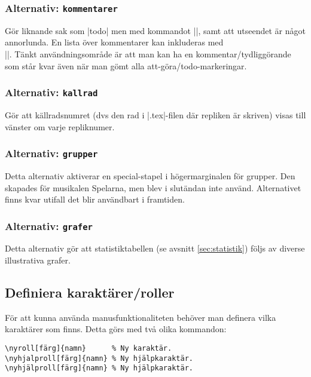 \documentclass[a4paper,12pt]{article}
\begin{document}
\subsubsection{Alternativ: \texttt{kommentarer}}
\label{alt:kommentarer}
Gör liknande sak som |todo| men med kommandot |\kommentar|, samt att utseendet är något annorlunda. En lista över kommentarer kan inkluderas med \\|\kommentarlista|. Tänkt användningsområde är att man kan ha en kommentar/tydliggörande som står kvar även när man gömt alla att-göra/todo-markeringar.

\subsubsection{Alternativ: \texttt{kallrad}}
\label{alt:kallrad}
Gör att källradsnumret (dvs den rad i |.tex|-filen där repliken är skriven) visas till vänster om varje repliknumer.


\subsubsection{Alternativ: \texttt{grupper}}
\label{alt:grupper}
Detta alternativ aktiverar en special-stapel i högermarginalen för grupper. Den skapades för musikalen Spelarna, men blev i slutändan inte använd. Alternativet finns kvar utifall det blir användbart i framtiden.


\subsubsection{Alternativ: \texttt{grafer}}
\label{alt:grafer}
Detta alternativ gör att statistiktabellen (se avsnitt \ref{sec:statistik}) följs av diverse illustrativa grafer.


\subsection{Definiera karaktärer/roller}
\label{sec:nyroll}
För att kunna använda manusfunktionaliteten behöver man definera vilka karaktärer som finns. Detta görs med två olika kommandon:

\begin{lstlisting}
\nyroll[färg]{namn}      % Ny karaktär.
\nyhjalproll[färg]{namn} % Ny hjälpkaraktär.
\nyhjälproll[färg]{namn} % Ny hjälpkaraktär.
\end{lstlisting}
\end{document}
